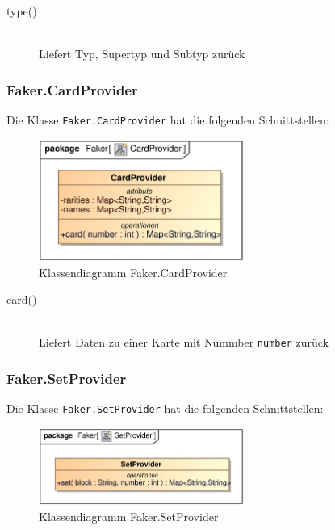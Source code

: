 \begin{description}
    \item[type()] \hfill \\
    Liefert Typ, Supertyp und Subtyp zurück
\end{description}

\subsubsection{Faker.CardProvider}
Die Klasse \verb|Faker.CardProvider| hat die folgenden Schnittstellen:

\begin{figure}[H]
    \myfloatalign
    \includegraphics[width=0.6\textwidth]{gfx/MtGDeepAnalysis/CardProvider.eps}
    \caption{Klassendiagramm Faker.CardProvider}
    \label{fig:class:Faker.CardProvider}
\end{figure}

\begin{description}
    \item[card()] \hfill \\
    Liefert Daten zu einer Karte mit Nummber \verb|number| zurück
\end{description}

\subsubsection{Faker.SetProvider}
Die Klasse \verb|Faker.SetProvider| hat die folgenden Schnittstellen:

\begin{figure}[H]
    \myfloatalign
    \includegraphics[width=0.6\textwidth]{gfx/MtGDeepAnalysis/SetProvider.eps}
    \caption{Klassendiagramm Faker.SetProvider}
    \label{fig:class:Faker.SetProvider}
\end{figure}

